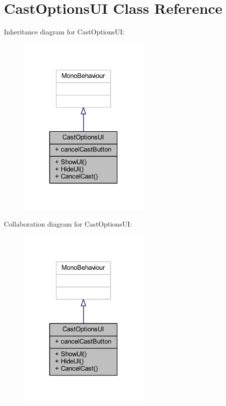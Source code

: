 \hypertarget{class_cast_options_u_i}{}\section{Cast\+Options\+UI Class Reference}
\label{class_cast_options_u_i}


Inheritance diagram for Cast\+Options\+UI\+:
\nopagebreak
\begin{figure}[H]
\begin{center}
\leavevmode
\includegraphics[width=183pt]{class_cast_options_u_i__inherit__graph}
\end{center}
\end{figure}


Collaboration diagram for Cast\+Options\+UI\+:
\nopagebreak
\begin{figure}[H]
\begin{center}
\leavevmode
\includegraphics[width=183pt]{class_cast_options_u_i__coll__graph}
\end{center}
\end{figure}
